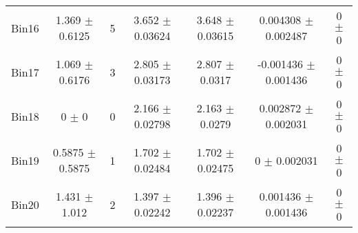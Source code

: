 \begin{tabular}{@{\extracolsep{4pt}}lcccccc@{}}
     Bin16 & 1.369 $\pm$ 0.6125 & 5 & 3.652 $\pm$ 0.03624 & 3.648 $\pm$ 0.03615 & 0.004308 $\pm$ 0.002487 & 0 $\pm$ 0 \\ 
     Bin17 & 1.069 $\pm$ 0.6176 & 3 & 2.805 $\pm$ 0.03173 & 2.807 $\pm$ 0.0317 & -0.001436 $\pm$ 0.001436 & 0 $\pm$ 0 \\ 
     Bin18 & 0 $\pm$ 0 & 0 & 2.166 $\pm$ 0.02798 & 2.163 $\pm$ 0.0279 & 0.002872 $\pm$ 0.002031 & 0 $\pm$ 0 \\ 
     Bin19 & 0.5875 $\pm$ 0.5875 & 1 & 1.702 $\pm$ 0.02484 & 1.702 $\pm$ 0.02475 & 0 $\pm$ 0.002031 & 0 $\pm$ 0 \\ 
     Bin20 & 1.431 $\pm$ 1.012 & 2 & 1.397 $\pm$ 0.02242 & 1.396 $\pm$ 0.02237 & 0.001436 $\pm$ 0.001436 & 0 $\pm$ 0 \\ 
\hline\hline
  \end{tabular}
